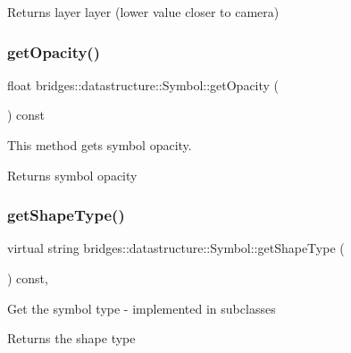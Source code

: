 \begin{DoxyReturn}{Returns}
layer layer (lower value closer to camera) 
\end{DoxyReturn}
\mbox{\label{classbridges_1_1datastructure_1_1_symbol_a2630c19b6efdda481556195fa149c334}} 
\subsubsection{\texorpdfstring{get\+Opacity()}{getOpacity()}}
{\footnotesize\ttfamily float bridges\+::datastructure\+::\+Symbol\+::get\+Opacity (\begin{DoxyParamCaption}{ }\end{DoxyParamCaption}) const\hspace{0.3cm}{\ttfamily [inline]}}



This method gets symbol opacity. 

\begin{DoxyReturn}{Returns}
symbol opacity 
\end{DoxyReturn}
\mbox{\label{classbridges_1_1datastructure_1_1_symbol_a1fb7cabce2915b103b8474658e8549f8}} 
\subsubsection{\texorpdfstring{get\+Shape\+Type()}{getShapeType()}}
{\footnotesize\ttfamily virtual string bridges\+::datastructure\+::\+Symbol\+::get\+Shape\+Type (\begin{DoxyParamCaption}{ }\end{DoxyParamCaption}) const\hspace{0.3cm}{\ttfamily [protected]}, {}}

Get the symbol type -\/ implemented in subclasses

\begin{DoxyReturn}{Returns}
the shape type 
\end{DoxyReturn}


